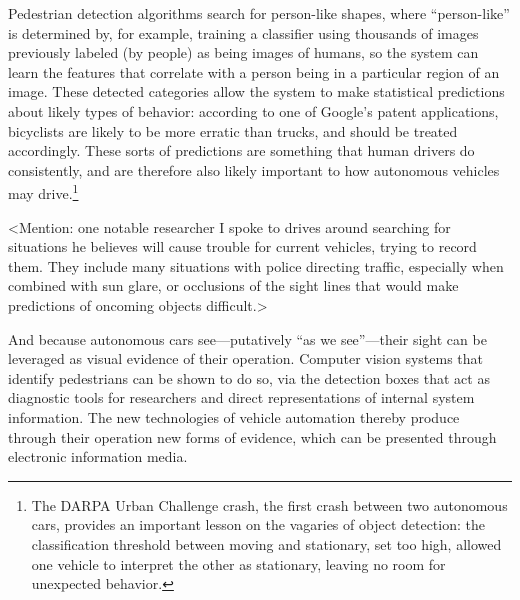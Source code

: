 Pedestrian detection algorithms search for person-like shapes, where
“person-like” is determined by, for example, training a classifier
using thousands of images previously labeled (by people) as being images of humans, so
the system can learn the features that correlate with a person being
in a particular region of an image. These detected categories allow the system to make
statistical predictions about likely types of behavior: according to
one of Google's patent applications, bicyclists are likely to be more
erratic than trucks, and should be treated
accordingly.\cite{predictPatent} These sorts of predictions are
something that human drivers do consistently, and are therefore also
likely important to how autonomous vehicles may drive.\footnote{The
  DARPA Urban Challenge crash, the first crash between two autonomous
  cars, provides an important lesson on the vagaries of object
  detection: the classification threshold between moving and
  stationary, set too high, allowed one vehicle to interpret the other
  as stationary, leaving no room for unexpected behavior.\cite{???}} 

<Mention: one notable researcher I spoke to drives around searching
for situations he believes will cause trouble for current vehicles,
trying to record them. They include many situations with police
directing traffic, especially when combined with sun glare, or
occlusions of the sight lines that would make predictions of oncoming
objects difficult.>

And because autonomous cars see---putatively “as we see”---their sight can
be leveraged as visual evidence of their operation. Computer vision systems that identify
pedestrians can be shown to do so, via the detection boxes that act as
diagnostic tools for researchers and direct representations of
internal system information. The new technologies of vehicle automation thereby produce through
their operation new forms of evidence, which can be presented through
electronic information media.


